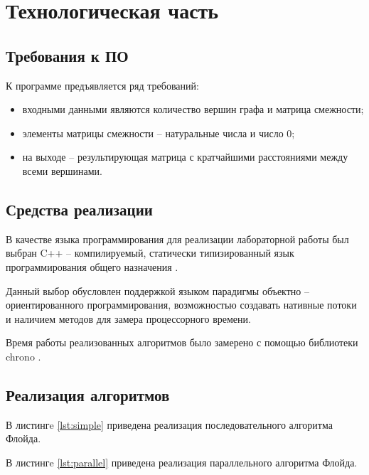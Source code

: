 \chapter{Технологическая часть}

\section{Требования к ПО}

К программе предъявляется ряд требований:
\begin{itemize}
	\item входными данными являются количество вершин графа и матрица смежности;
	\item элементы матрицы смежности -- натуральные числа и число 0;
	\item на выходе -- результирующая матрица с кратчайшими расстояниями между всеми вершинами.
\end{itemize}

\section{Средства реализации}

В качестве языка программирования для реализации лабораторной работы был выбран C++ -- компилируемый, статически типизированный язык программирования общего назначения \cite{cpp}. 

Данный выбор обусловлен поддержкой языком парадигмы объектно -- ориентированного программирования, возможностью создавать нативные потоки и наличием методов для замера процессорного времени.

Время работы реализованных алгоритмов было замерено с помощью библиотеки chrono \cite{chrono}.

\section{Реализация алгоритмов}

В листингe \ref{lst:simple} приведена реализация последовательного алгоритма Флойда.


В листингe \ref{lst:parallel} приведена реализация параллельного алгоритма Флойда.


